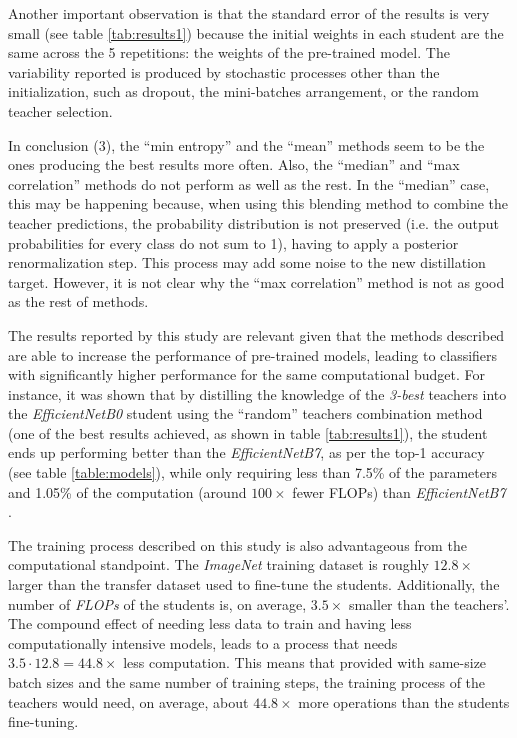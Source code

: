  Another important observation is that the standard error of the results is very small (see table \ref{tab:results1}) because the initial weights in each student are the same across the 5 repetitions: the weights of the pre-trained model. The variability reported is produced by stochastic processes other than the initialization, such as dropout, the mini-batches arrangement, or the random teacher selection.

 In conclusion (3), the ``min entropy'' and the ``mean'' methods seem to be the ones producing the best results more often. Also, the ``median'' and ``max correlation'' methods do not perform as well as the rest. In the ``median'' case, this may be happening because, when using this blending method to combine the teacher predictions, the probability distribution is not preserved (i.e. the output probabilities for every class do not sum to 1),  having to apply a posterior renormalization step. This process may add some noise to the new distillation target. However, it is not clear why the ``max correlation'' method is not as good as the rest of methods.   
 
 
The results reported by this study are relevant given that the methods described are able to increase the performance of pre-trained models, leading to classifiers with significantly higher performance for the same computational budget.   For instance, it was shown that by distilling the knowledge of the \textit{3-best} teachers into the \textit{EfficientNetB0} student using the ``random'' teachers combination method (one of the best results achieved, as shown in table \ref{tab:results1}), the student ends up performing better than the \textit{EfficientNetB7}, as per the top-1 accuracy (see table \ref{table:models}), while only requiring less than 7.5\% of the parameters and 1.05\% of the computation (around $100\times$ fewer FLOPs) than \textit{EfficientNetB7} \autocite{tan2019}.
 
 The training process described on this study is also advantageous from the computational standpoint. The \textit{ImageNet} training dataset is roughly $12.8\times$ larger than the transfer dataset used to fine-tune the students. Additionally, the number of \textit{FLOPs} of the students is, on average, $3.5\times$ smaller than the teachers'. The compound effect of needing less data to train and having less computationally intensive models, leads to a process that needs $3.5 \cdot 12.8 = 44.8\times$ less computation. This means that provided with same-size batch sizes and the same number of training steps, the training process of the teachers would need, on average, about $44.8\times$ more operations than the students fine-tuning. 
 
